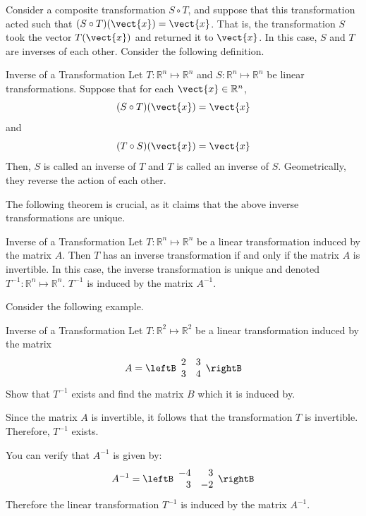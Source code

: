 Consider a composite transformation $S \circ T$, and suppose that this transformation acted such that $(S \circ T) (\vect{x}) = \vect{x}$. That is, the transformation $S$ took the vector $T(\vect{x})$ and returned it to $\vect{x}$. In this case, $S$ and $T$ are inverses of each other. Consider the following definition.  

\begin{definition}{Inverse of a Transformation}\label{def:inversetransformation}
Let $T: \mathbb{R}^n \mapsto \mathbb{R}^n$ and $S:\mathbb{R}^n \mapsto \mathbb{R}^n$ be linear transformations. Suppose that for each $\vect{x} \in \mathbb{R}^n$, 
\[
(S \circ T)(\vect{x}) = \vect{x}
\]
and 
\[
(T \circ S)(\vect{x}) = \vect{x}
\]
Then, $S$ is called an inverse of $T$  and $T$ is called an inverse of $S$. Geometrically, they reverse the action of each other. 
\end{definition}

The following theorem is crucial, as it claims that the above inverse transformations are unique. 

\begin{theorem}{Inverse of a Transformation}\label{thm:inversetransformation}
Let $T:\mathbb{R}^n \mapsto \mathbb{R}^n$ be a linear transformation induced by the matrix $A$. Then $T$ has an inverse transformation if and only if the matrix $A$ is invertible. In this case, the inverse transformation is unique and denoted $T^{-1}: \mathbb{R}^n \mapsto \mathbb{R}^n$. $T^{-1}$ is induced by the matrix $A^{-1}$. 
\end{theorem}

Consider the following example. 

\begin{example}{Inverse of a Transformation}\label{exa:inversetransformation}
Let $T: \mathbb{R}^2 \mapsto \mathbb{R}^2$ be a linear transformation induced by the matrix 
\[
A = 
\leftB
\begin{array}{rr}
2 & 3 \\
3 & 4
\end{array}
\rightB
\]
Show that $T^{-1}$ exists and find the matrix $B$ which it is induced by. 
\end{example}

\begin{solution}
Since the matrix $A$ is invertible, it follows that the transformation $T$ is invertible. Therefore, $T^{-1}$ exists. 

You can verify that $A^{-1}$ is given by:
\[
A^{-1}
=
\leftB
\begin{array}{rr}
-4 & 3 \\
3 & -2
\end{array}
\rightB
\]
Therefore the linear transformation $T^{-1}$ is induced by the matrix $A^{-1}$. 
\end{solution}
